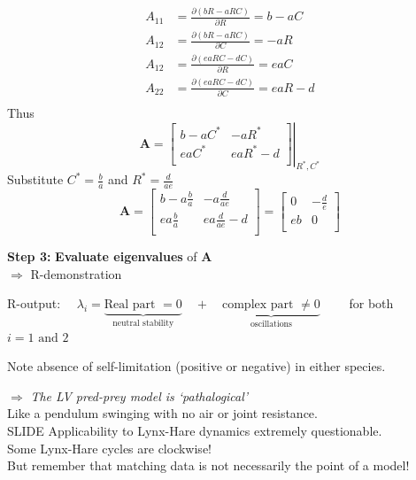 \documentclass{article}
\newcommand{\note}[1]{\colorbox{gray!30}{#1}}
\newcommand{\ind}{\-\hspace{1cm}}
\begin{document}
\begin{align*}
	A_{11} &= \frac{ \partial (bR-aRC)}{\partial R} = b-aC\\
		A_{12} &= \frac{ \partial (bR-aRC)}{\partial C} = -aR\\
			A_{12} &= \frac{ \partial (eaRC-dC)}{\partial R} = eaC\\
				A_{22} &= \frac{ \partial (eaRC-dC)}{\partial C} = eaR-d\\
\end{align*}
Thus
\begin{equation*}
	\mathbf{A}=
\left.	\begin{bmatrix}
		b-a C^* & -aR^*\\[1em]
		eaC^* & eaR^*-d\\
	\end{bmatrix}
	\right |_{R^*,C^*}
\end{equation*}
Substitute $C^*=\frac{b}{a}$ and $R^*=\frac{d}{ae}$
\begin{equation*}
	\mathbf{A}=
	\begin{bmatrix}
		b-a \frac{b}{a} & -a \frac{d}{ae}\\[1em]
		ea\frac{b}{a} & ea\frac{d}{ae}-d\\
	\end{bmatrix}
	=\begin{bmatrix}
			0 & -\frac{d}{e}\\[1em]
			eb & 0\\
	\end{bmatrix}
\end{equation*}

\textbf{Step 3:} \textbf{Evaluate eigenvalues} of $\mathbf{A}$\\
\ind \note{$\Rightarrow $ R-demonstration}

\ind R-output: $\quad \lambda_i = \underbrace{\text{Real part }= 0}_{\text{neutral stability}} \quad + \quad \underbrace{\text{complex part }\neq 0}_{\text{oscillations}} \quad \quad $ for both $i=1 \text{ and } 2$

\vspace{0.3cm}

Note absence of self-limitation (positive or negative) in either species.

$\Rightarrow$ \emph{The LV pred-prey model is `pathalogical'}\\
\ind Like a pendulum swinging with no air or joint resistance.\\
\ind \note{SLIDE } 
Applicability to Lynx-Hare dynamics extremely questionable.\\
\ind \ind \ind Some Lynx-Hare cycles are clockwise!\\
\ind But remember that matching data is not necessarily the point of a model!
\end{document}
